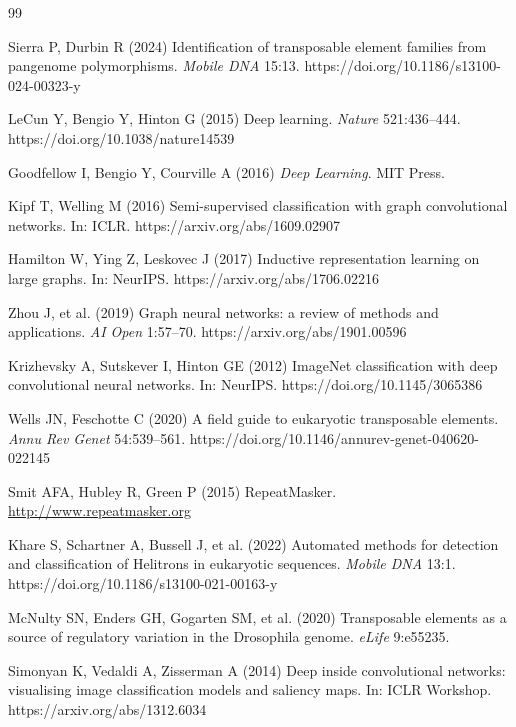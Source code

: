 \documentclass[12pt]{article}
\begin{document}
\begin{thebibliography}{99}

Sierra P, Durbin R (2024) Identification of transposable element families from pangenome polymorphisms. \textit{Mobile DNA} 15:13. https://doi.org/10.1186/s13100-024-00323-y

LeCun Y, Bengio Y, Hinton G (2015) Deep learning. \textit{Nature} 521:436--444. https://doi.org/10.1038/nature14539

Goodfellow I, Bengio Y, Courville A (2016) \textit{Deep Learning}. MIT Press.

Kipf T, Welling M (2016) Semi-supervised classification with graph convolutional networks. In: ICLR. https://arxiv.org/abs/1609.02907

Hamilton W, Ying Z, Leskovec J (2017) Inductive representation learning on large graphs. In: NeurIPS. https://arxiv.org/abs/1706.02216

Zhou J, et al. (2019) Graph neural networks: a review of methods and applications. \textit{AI Open} 1:57--70. https://arxiv.org/abs/1901.00596

Krizhevsky A, Sutskever I, Hinton GE (2012) ImageNet classification with deep convolutional neural networks. In: NeurIPS. https://doi.org/10.1145/3065386

Wells JN, Feschotte C (2020) A field guide to eukaryotic transposable elements. \textit{Annu Rev Genet} 54:539--561. https://doi.org/10.1146/annurev-genet-040620-022145

Smit AFA, Hubley R, Green P (2015) RepeatMasker. \url{http://www.repeatmasker.org}

Khare S, Schartner A, Bussell J, et al. (2022) Automated methods for detection and classification of Helitrons in eukaryotic sequences. \textit{Mobile DNA} 13:1. https://doi.org/10.1186/s13100-021-00163-y

McNulty SN, Enders GH, Gogarten SM, et al. (2020) Transposable elements as a source of regulatory variation in the Drosophila genome. \textit{eLife} 9:e55235.

Simonyan K, Vedaldi A, Zisserman A (2014) Deep inside convolutional networks: visualising image classification models and saliency maps. In: ICLR Workshop. https://arxiv.org/abs/1312.6034


\end{thebibliography}
\end{document}
